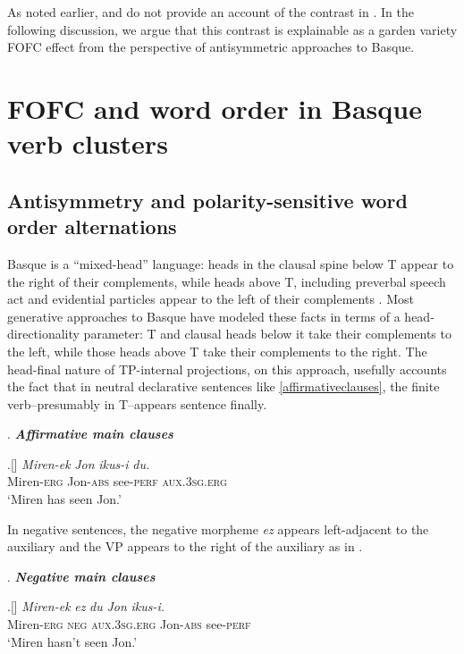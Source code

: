 \documentclass[output=paper]{langscibook}
\begin{document}
As noted earlier, \cite{balza2010} and \cite{etxepare-uribeetxebarria2009} do not provide an account of the contrast in \Last.  In the following discussion, we argue that this contrast is explainable as a garden variety FOFC effect from the perspective of antisymmetric approaches to Basque.

\section{FOFC and word order in Basque verb clusters}
\subsection{Antisymmetry and polarity-sensitive word order alternations}

Basque is a ``mixed-head'' language: heads in the clausal spine below T appear to the right of their complements, while heads above T, including preverbal speech act and evidential particles appear to the left of their complements \citep{derijk1969, ortizdeurbina1989, ortizdeurbina1994, laka1990,elordieta2001, irurtzun2007, elordieta2008} . Most generative approaches to Basque have modeled these facts in terms of a head-directionality parameter: T and clausal heads below it take their complements to the left, while those heads above T take their complements to the right. The head-final nature of TP-internal projections, on this approach, usefully accounts the fact that in neutral declarative sentences like \protect\ref{affirmativeclauses}, the finite verb--presumably in T--appears sentence finally.

\ex. \textbf{\textit{Affirmative main clauses}} \protect\label{affirmativeclauses}\samepage

\exg.[{}] \textit{Miren-ek}   \textit{Jon} \textit{ikus-i}      \textit{du.}   \\				
         Miren-\textsc{erg} Jon-\textsc{abs} see-\textsc{perf}   \textsc{aux}.\textsc{3sg.erg} \\
         `Miren has seen Jon.'


In negative sentences, the negative morpheme \textit{ez} appears left-adjacent to the auxiliary and the VP appears to the right of the auxiliary as in \Next.

\ex. \textbf{\textit{Negative main clauses}}\protect\label{negativeclauses}\samepage

\exg.[{}]   \textit{Miren-ek}   \textit{ez}     \textit{du}   \textit{Jon} \textit{ikus-i.} 	\\			
         Miren-\textsc{erg} \textsc{neg} \textsc{aux}.\textsc{3sg.erg} Jon-\textsc{abs} see-\textsc{perf} \\
         `Miren hasn't seen Jon.'
\end{document}
